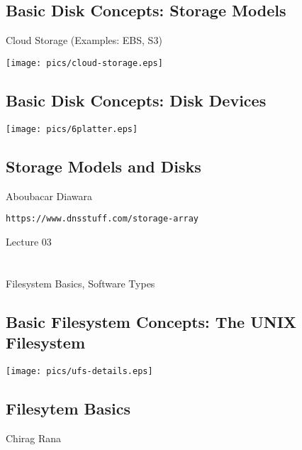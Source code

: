 \documentclass[xga]{xdvislides}
\begin{document}
\subsection{Basic Disk Concepts: Storage Models}
Cloud Storage (Examples: EBS, S3)
\vfill
\begin{center}
	\texttt{[image: pics/cloud-storage.eps]} \\
\end{center}
\vfill

\subsection{Basic Disk Concepts: Disk Devices}
\vfill
	\begin{center}
		\texttt{[image: pics/6platter.eps]} \\
	\end{center}
\vfill

\subsection{Storage Models and Disks}
Aboubacar Diawara \\
\vspace{1in}

\verb+https://www.dnsstuff.com/storage-array+

\newpage
\vspace*{\fill}
\begin{center}
    \Hugesize
        Lecture 03 \\ [1em]
    \hspace*{5mm}
    \blueline\\
    \hspace*{5mm}\\
	Filesystem Basics, Software Types
\end{center}
\vspace*{\fill}

\subsection{Basic Filesystem Concepts: The UNIX Filesystem}
\begin{center}
	\texttt{[image: pics/ufs-details.eps]} \\
\end{center}
\vspace*{\fill}

\subsection{Filesytem Basics}
Chirag Rana \\
\vspace{1in}
\end{document}
